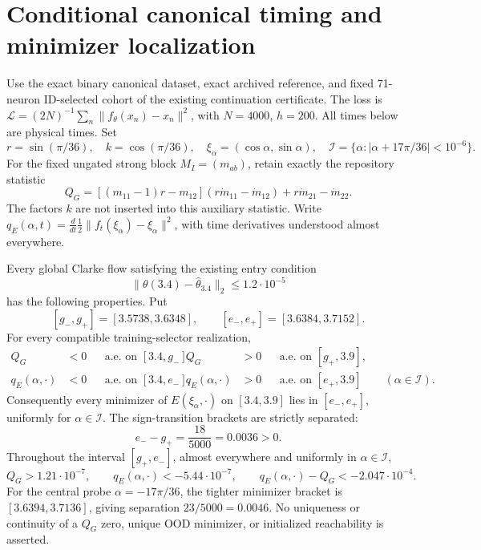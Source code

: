 \section{Conditional canonical timing and minimizer localization}
\label{sec:canonical-full-tube-timing}
Use the exact binary canonical dataset, exact archived reference, and fixed
71-neuron ID-selected cohort of the existing continuation certificate.
The loss is $\mathcal L=(2N)^{-1}\sum_n\|f_\theta(x_n)-x_n\|^2$,
with $N=4000$, $h=200$. All times below are physical times. Set
\[
 r=\sin(\pi/36),\quad k=\cos(\pi/36),\quad
 \xi_\alpha=(\cos\alpha,\sin\alpha),\quad
 \mathcal I=\{\alpha:|\alpha+17\pi/36|<10^{-6}\}.
\]
For the fixed ungated strong block $M_I=(m_{ab})$, retain exactly the
repository statistic
\[
 Q_G=[(m_{11}-1)r-m_{12}](r\dot m_{11}-\dot m_{12})
           +r\dot m_{21}-\dot m_{22}.
\]
The factors $k$ are not inserted into this auxiliary statistic.
Write $q_E(\alpha,t)=\frac{d}{dt}\frac12\|f_t(\xi_\alpha)-\xi_\alpha\|^2$,
with time derivatives understood almost everywhere.

\begin{theorem}
\label{thm:canonical-full-tube-timing}
Every global Clarke flow satisfying the existing entry condition
\[
 \|\theta(3.4)-\widehat\theta_{3.4}\|_2\le1.2\cdot10^{-5}
\]
has the following properties. Put
\[
 [g_-,g_+]=[3.5738,3.6348],\qquad
 [e_-,e_+]=[3.6384,3.7152].
\]
For every compatible training-selector realization,
\begin{align*}
 Q_G&<0&&\text{a.e. on }[3.4,g_-],&
 Q_G&>0&&\text{a.e. on }[g_+,3.9],\\
 q_E(\alpha,\cdot)&<0&&\text{a.e. on }[3.4,e_-],&
 q_E(\alpha,\cdot)&>0&&\text{a.e. on }[e_+,3.9]
 \qquad(\alpha\in\mathcal I).
\end{align*}
Consequently every minimizer of $E(\xi_\alpha,\cdot)$ on $[3.4,3.9]$
lies in $[e_-,e_+]$, uniformly for $\alpha\in\mathcal I$.
The sign-transition brackets are strictly separated:
\[
 e_- -g_+=\frac{18}{5000}=0.0036>0.
\]
Throughout the interval $[g_+,e_-]$, almost everywhere and uniformly in
$\alpha\in\mathcal I$,
\[
 Q_G>1.21\cdot10^{-7},\qquad
 q_E(\alpha,\cdot)<-5.44\cdot10^{-7},\qquad
 q_E(\alpha,\cdot)-Q_G<-2.047\cdot10^{-4}.
\]
For the central probe $\alpha=-17\pi/36$, the tighter minimizer bracket is
$[3.6394,3.7136]$, giving separation $23/5000=0.0046$.
No uniqueness or continuity of a $Q_G$ zero, unique OOD minimizer, or
initialized reachability is asserted.
\end{theorem}

